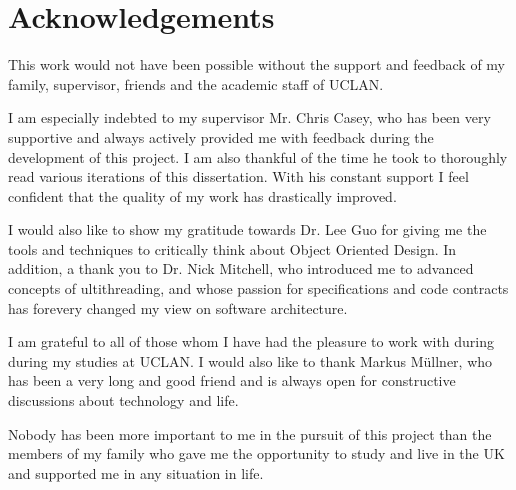 \chapter*{Acknowledgements}
This work would not have been possible without the support and feedback of my family, supervisor, friends and the academic staff of UCLAN.

I am especially indebted to	my supervisor Mr. Chris Casey, who has been very supportive and always actively provided me with feedback during the development of this project. I am also thankful of the time he took to thoroughly read various iterations of this dissertation. With his constant support I feel confident that the quality of my work has drastically improved. 

I would also like to show my gratitude towards Dr. Lee Guo for giving me the tools and techniques to critically think about Object Oriented Design. In addition, a thank you to Dr. Nick Mitchell, who introduced me to advanced concepts of  ultithreading, and whose passion for specifications and code contracts has forevery changed my view on software architecture.

I am grateful to all of those whom I have had the pleasure to work with during during my studies at UCLAN. I would also like to thank Markus Müllner, who has been a very long and good friend and is always open for constructive discussions about technology and life.

Nobody has been	more important to me in the	pursuit	of this	project	than the members of	my family who gave me the opportunity to study and live in the UK and supported me in any situation in life.

